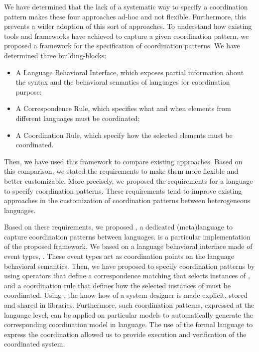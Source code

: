 We have determined that the lack of a systematic way to specify a coordination pattern makes these four approaches ad-hoc and not flexible. Furthermore, this prevents a wider adoption of this sort of approaches. To understand how existing tools and frameworks have achieved to capture a given coordination pattern, we proposed a framework for the specification of coordination patterns. We have determined three building-blocks:

	\begin{itemize}
	\item A Language Behavioral Interface, which exposes partial information about the syntax and the behavioral semantics of languages for coordination purpose; 
	
	\item A Correspondence Rule, which specifies what and when elements from different languages must be coordinated;
	
	\item A Coordination Rule, which specify how the selected elements must be coordinated. 
\end{itemize}

Then, we have used this framework to compare existing approaches. Based on this comparison, we stated the requirements to make them more flexible and better customizable. More precisely, we proposed the requirements for a language to specify coordination patterns. These requirements tend to improve existing approaches in the customization of coordination patterns between heterogeneous languages.

Based on these requirements, we proposed \bcool, a dedicated (meta)language to capture coordination patterns between languages. \bcool is a particular implementation of the proposed framework. We based on a language behavioral interface made of event types, \ie \dse. These event types act as coordination points on the language behavioral semantics. Then, we have proposed to specify coordination patterns by using operators that define a correspondence matching that selects instances of \dse, and a coordination rule that defines how the selected instances of \dse must be coordinated. Using \bcool, the know-how of a system designer is made explicit, stored and shared in libraries. Furthermore, such coordination patterns, expressed at the language level, can be applied on particular models to automatically generate the corresponding coordination model in \ccsl language. The use of the formal \ccsl language to express the coordination allowed us to provide execution and verification of the coordinated system.
	

